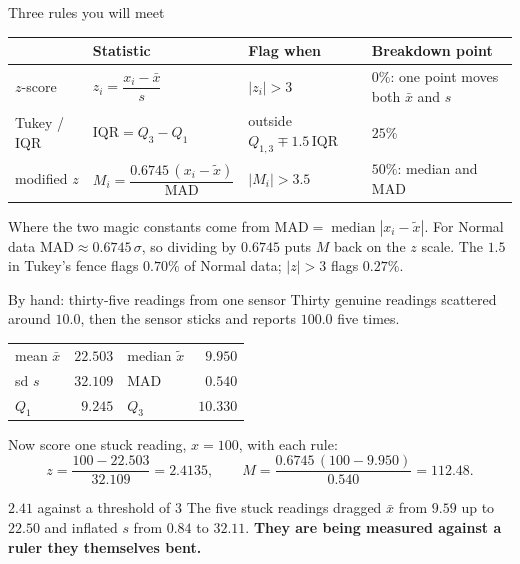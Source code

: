 \documentclass[aspectratio=169]{beamer}
\begin{document}
\begin{frame}[shrink=8]{Three rules you will meet}
  \begin{center}\small
  \begin{tabular}{@{}lllp{2.9cm}@{}}
    \toprule
    & \textbf{Statistic} & \textbf{Flag when} & \textbf{Breakdown point}\\
    \midrule
    $z$-score & $z_i = \dfrac{x_i-\bar x}{s}$ & $|z_i| > 3$ &
      $0\%$: one point moves both $\bar x$ and $s$\\[8pt]
    Tukey / IQR & $\mathrm{IQR}=Q_3-Q_1$ &
      outside $Q_{1,3} \mp 1.5\,\mathrm{IQR}$ & $25\%$\\[8pt]
    modified $z$ & $M_i = \dfrac{0.6745\,(x_i-\tilde x)}{\mathrm{MAD}}$ &
      $|M_i| > 3.5$ & $50\%$: median and MAD\\
    \bottomrule
  \end{tabular}
  \end{center}
  \vspace{0.4em}
  \begin{block}{Where the two magic constants come from}
    \small $\mathrm{MAD} = \operatorname{median}|x_i - \tilde x|$. For Normal
    data $\mathrm{MAD} \approx 0.6745\,\sigma$, so dividing by $0.6745$ puts
    $M$ back on the $z$ scale. The $1.5$ in Tukey's fence flags
    $0.70\%$ of Normal data; $|z|>3$ flags $0.27\%$.
  \end{block}
\end{frame}

\begin{frame}[shrink=8]{By hand: thirty-five readings from one sensor}
  Thirty genuine readings scattered around $10.0$, then the sensor sticks and
  reports $100.0$ five times.
  \begin{center}\small
  \begin{tabular}{@{}lrlr@{}}
    \toprule
    mean $\bar x$ & $22.503$ & median $\tilde x$ & $9.950$\\
    sd $s$        & $32.109$ & MAD               & $0.540$\\
    $Q_1$         & $9.245$  & $Q_3$             & $10.330$\\
    \bottomrule
  \end{tabular}
  \end{center}
  \vspace{0.2em}
  Now score one stuck reading, $x = 100$, with each rule:
  \[
    z = \frac{100 - 22.503}{32.109} = 2.4135,
    \qquad
    M = \frac{0.6745\,(100 - 9.950)}{0.540} = 112.48 .
  \]
  \begin{alertblock}{$2.41$ against a threshold of $3$}
    \small The five stuck readings dragged $\bar x$ from $9.59$ up to $22.50$
    and inflated $s$ from $0.84$ to $32.11$. \textbf{They are being measured
    against a ruler they themselves bent.}
  \end{alertblock}
\end{frame}
\end{document}
